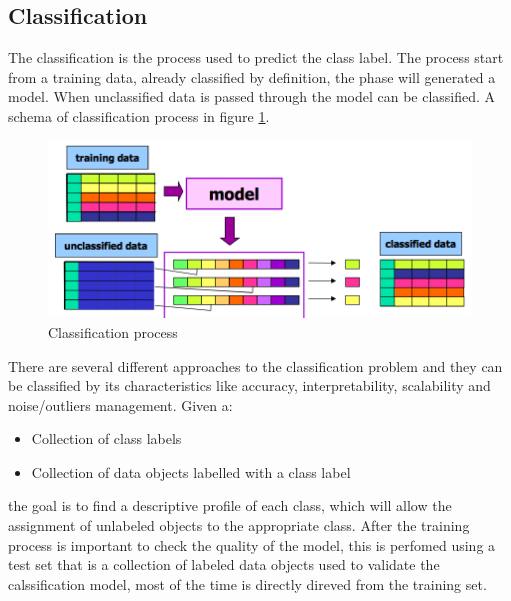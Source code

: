 \documentclass[12pt]{article}
\begin{document}
\subsection{Classification}
The classification is the process used to predict the class label. The process start from a training data, already classified by definition, the phase will generated a model. When unclassified data is passed through the model can be classified. A schema of classification process in figure \ref{fig:class}.
\begin{figure}[h!]
  \includegraphics[width=\linewidth]{images/class.png}
  \caption{Classification process}
  \label{fig:class}
\end{figure}
There are several different approaches to the classification problem and they can be classified by its characteristics like accuracy, interpretability, scalability and noise/outliers management. Given a:
\begin{itemize}
  \item Collection of class labels
  \item Collection of data objects labelled with a class label
\end{itemize}
the goal is to find a descriptive profile of each class, which will allow the assignment of unlabeled objects to the appropriate class. After the training process is important to check the quality of the model, this is perfomed using a test set that is a collection of labeled data objects used to validate the calssification model, most of the time is directly direved from the training set.
\end{document}
